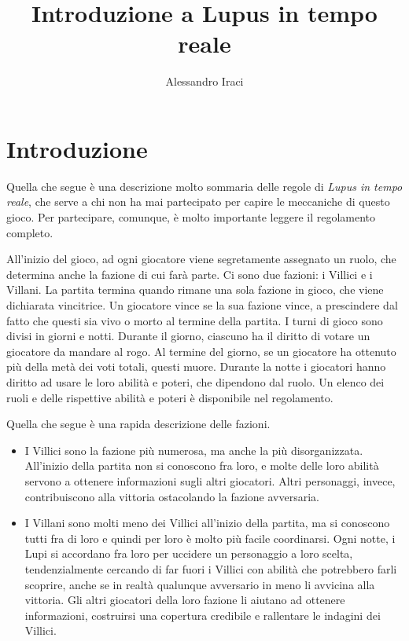 \documentclass[a4paper,10pt]{article}
\title{Introduzione a Lupus in tempo reale}
\author{Alessandro Iraci}
\begin{document}
\maketitle

\section{Introduzione}

Quella che segue è una descrizione molto sommaria delle regole di \emph{Lupus in tempo reale}, che serve a chi non ha mai partecipato per capire le meccaniche di questo gioco. Per partecipare, comunque, è molto importante leggere il regolamento completo.

All'inizio del gioco, ad ogni giocatore viene segretamente assegnato un ruolo, che determina anche la fazione di cui farà parte. Ci sono due fazioni: i Villici e i Villani. La partita termina quando rimane una sola fazione in gioco, che viene dichiarata vincitrice. Un giocatore vince se la sua fazione vince, a prescindere dal fatto che questi sia vivo o morto al termine della partita.
I turni di gioco sono divisi in giorni e notti. Durante il giorno, ciascuno ha il diritto di votare un giocatore da mandare al rogo. Al termine del giorno, se un giocatore ha ottenuto più della metà dei voti totali, questi muore. Durante la notte i giocatori hanno diritto ad usare le loro abilità e poteri, che dipendono dal ruolo. Un elenco dei ruoli e delle rispettive abilità e poteri è disponibile nel regolamento.

Quella che segue è una rapida descrizione delle fazioni.

\begin{itemize}
	
	\item I Villici sono la fazione più numerosa, ma anche la più disorganizzata. All'inizio della partita non si conoscono fra loro, e molte delle loro abilità servono a ottenere informazioni sugli altri giocatori. Altri personaggi, invece, contribuiscono alla vittoria ostacolando la fazione avversaria.
	
 	\item I Villani sono molti meno dei Villici all'inizio della partita, ma si conoscono tutti fra di loro e quindi per loro è molto più facile coordinarsi. Ogni notte, i Lupi si accordano fra loro per uccidere un personaggio a loro scelta, tendenzialmente cercando di far fuori i Villici con abilità che potrebbero farli scoprire, anche se in realtà qualunque avversario in meno li avvicina alla vittoria. Gli altri giocatori della loro fazione li aiutano ad ottenere informazioni, costruirsi una copertura credibile e rallentare le indagini dei Villici.
\end{itemize}
\end{document}
